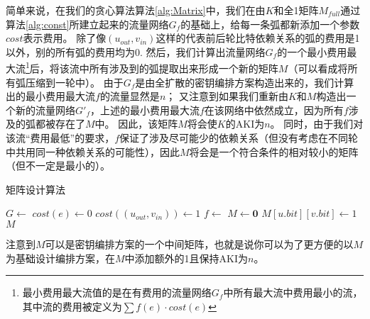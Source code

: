 简单来说，在我们的贪心算法算法\ref{alg:Matrix}中，我们在由$K$和全1矩阵$M_{full}$通过算法\ref{alg:const}所建立起来的流量网络$G_f$的基础上，给每一条弧都新添加一个参数$cost$表示费用。
除了像$(u_{out},v_{in})$这样的代表前后轮比特依赖关系的弧的费用是1以外，别的所有弧的费用均为0.
然后，我们计算出流量网络$G_f$的一个最小费用最大流\footnote{最小费用最大流值的是在有费用的流量网络$G_f$中所有最大流中费用最小的流，其中流的费用被定义为$\sum f(e)\cdot cost(e)$}后，将该流中所有涉及到的弧提取出来形成一个新的矩阵$M$（可以看成将所有弧压缩到一轮中）。
由于$G_f$是由全扩散的密钥编排方案构造出来的，我们计算出的最小费用最大流$f$的流量显然是$n$；
又注意到如果我们重新由$K$和$M$构造出一个新的流量网络$G'_f$，上述的最小费用最大流$f$在该网络中依然成立，因为所有$f$涉及的弧都被存在了$M$中。
因此，该矩阵$M$将会使$K$的AKI为$n$。
同时，由于我们对该流“费用最低”的要求，$f$保证了涉及尽可能少的依赖关系（但没有考虑在不同轮中共用同一种依赖关系的可能性），因此$M$将会是一个符合条件的相对较小的矩阵（但不一定是最小的）。
\begin{algorithm}
    \caption{矩阵设计算法}
    \begin{algorithmic}[1]
            \State $G \gets$
            \State $cost(e)\gets 0$
            \EndFor
            \State $cost((u_{out},v_{in}))\gets 1$
            \EndFor
            \State $f \gets$
            \State $M \gets \mathbf{0}$
            \State $M[u.bit][v.bit]\gets 1$
            \EndFor
            \State \Return $M$
        \EndFunction
    \end{algorithmic}
    \label{alg:Matrix}
\end{algorithm}

注意到$M$可以是密钥编排方案的一个中间矩阵，也就是说你可以为了更方便的以$M$为基础设计编排方案，在$M$中添加额外的1且保持AKI为$n$。

